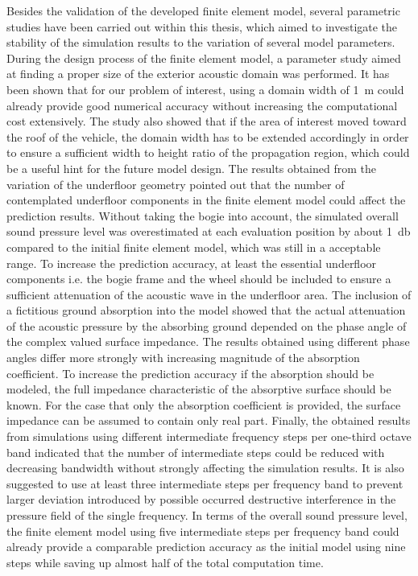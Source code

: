 Besides the validation of the developed finite element model, several parametric studies have been carried out within this thesis, which aimed to investigate the stability of the simulation results to the variation of several model parameters.
During the design process of the finite element model, a parameter study aimed at finding a proper size of the exterior acoustic domain was performed. It has been shown that for our problem of interest, using a domain width of \SI{1}{\meter} could already provide good numerical accuracy without increasing the computational cost extensively. The study also showed that if the area of interest moved toward the roof of the vehicle, the domain width has to be extended accordingly in order to ensure a sufficient width to height ratio of the propagation region, which could be a useful hint for the future model design.
The results obtained from the variation of the underfloor geometry pointed out that the number of contemplated underfloor components in the finite element model could affect the prediction results. Without taking the bogie into account, the simulated overall sound pressure level was overestimated at each evaluation position by about \SI{1}{\decibel} compared to the initial finite element model, which was still in a acceptable range. To increase the prediction accuracy, at least the essential underfloor components i.e. the bogie frame and the wheel should be included to ensure a sufficient attenuation of the acoustic wave in the underfloor area.
The inclusion of a fictitious ground absorption into the model showed that the actual attenuation of the acoustic pressure by the absorbing ground depended on the phase angle of the complex valued surface impedance. The results obtained using different phase angles differ more strongly with increasing magnitude of the absorption coefficient. To increase the prediction accuracy if the absorption should be modeled, the full impedance characteristic of the absorptive surface should be known. For the case that only the absorption coefficient is provided, the surface impedance can be assumed to contain only real part.
Finally, the obtained results from simulations using different intermediate frequency steps per one-third octave band indicated that the number of intermediate steps could be reduced with decreasing bandwidth without strongly affecting the simulation results. It is also suggested to use at least three intermediate steps per frequency band to prevent larger deviation introduced by possible occurred destructive interference in the pressure field of the single frequency. In terms of the overall sound pressure level, the finite element model using five intermediate steps per frequency band could already provide a comparable prediction accuracy as the initial model using nine steps while saving up almost half of the total computation time.


